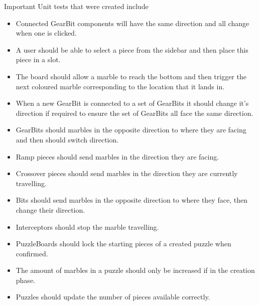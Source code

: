 \documentclass{l4proj}
\begin{document}
Important Unit tests that were created include
\begin{itemize}
    \item Connected GearBit components will have the same direction and all change when one is clicked.
    \item A user should be able to select a piece from the sidebar and then place this piece in a slot.
    \item The board should allow a marble to reach the bottom and then trigger the next coloured marble corresponding to the location that it lands in.
    \item When a new GearBit is connected to a set of GearBits it should change it's direction if required to ensure the set of GearBits all face the same direction.
    \item GearBits should marbles in the opposite direction to where they are facing and then should switch direction.
    \item Ramp pieces should send marbles in the direction they are facing.
    \item Crossover pieces should send marbles in the direction they are currently travelling.
    \item Bits should send marbles in the opposite direction to where they face, then change their direction.
    \item Interceptors should stop the marble travelling.
    \item PuzzleBoards should lock the starting pieces of a created puzzle when confirmed.
    \item The amount of marbles in a puzzle should only be increased if in the creation phase.
    \item Puzzles should update the number of pieces available correctly.
\end{itemize}
\end{document}

